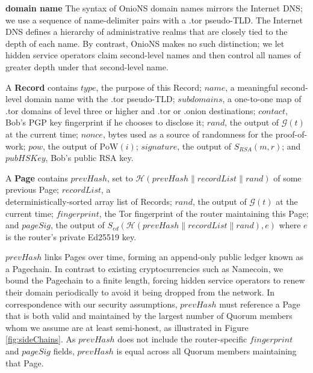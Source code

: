 \documentclass[conference]{IEEEtran}
\newcommand*\concat{\mathbin{\|}}
\begin{document}
\textbf{domain name} The syntax of OnioNS domain names mirrors the Internet DNS; we use a sequence of name-delimiter pairs with a .tor pseudo-TLD. The Internet DNS defines a hierarchy of administrative realms that are closely tied to the depth of each name. By contrast, OnioNS makes no such distinction; we let hidden service operators claim second-level names and then control all names of greater depth under that second-level name.

A \textbf{Record} contains $ \mathit{type} $, the purpose of this Record; $ \mathit{name} $, a meaningful second-level domain name with the .tor pseudo-TLD; $ \mathit{subdomains} $, a one-to-one map of .tor domains of level three or higher and .tor or .onion destinations; $ \mathit{contact} $, Bob's PGP key fingerprint if he chooses to disclose it; $ \mathit{rand} $, the output of $ \mathcal{G}(t) $ at the current time; $ \mathit{nonce} $, bytes used as a source of randomness for the proof-of-work; $ \mathit{pow} $, the output of $ \mathrm{PoW}(i) $;  $ \mathit{signature} $, the output of $ S_{\mathit{RSA}}(m, r) $; and $ \mathit{pubHSKey} $, Bob's public RSA key.

A \textbf{Page} contains $ \mathit{prevHash} $, set to $ \mathcal{H}(\mathit{prevHash} \concat \mathit{recordList} \concat \mathit{rand}) $ of some previous Page; $ \mathit{recordList} $, a \\ deterministically-sorted array list of Records; $ \mathit{rand} $, the output of $ \mathcal{G}(t) $ at the current time; $ \mathit{fingerprint} $, the Tor fingerprint of the router maintaining this Page; and $ \mathit{pageSig} $, the output of  $ S_{\mathit{ed}}(\mathcal{H}(\mathit{prevHash} \concat \mathit{recordList} \concat \mathit{rand}), e) $ where $ e $ is the router's private Ed25519 key.

$ \mathit{prevHash} $ links Pages over time, forming an append-only public ledger known as a Pagechain. In contrast to existing cryptocurrencies such as Namecoin, we bound the Pagechain to a finite length, forcing hidden service operators to renew their domain periodically to avoid it being dropped from the network. In correspondence with our security assumptions, $ \mathit{prevHash} $ must reference a Page that is both valid and maintained by the largest number of Quorum members whom we assume are at least semi-honest, as illustrated in Figure \ref{fig:sideChains}. As $ \mathit{prevHash} $ does not include the router-specific $ \mathit{fingerprint} $ and $ \mathit{pageSig} $ fields, $ \mathit{prevHash} $ is equal across all Quorum members maintaining that Page.
\end{document}
